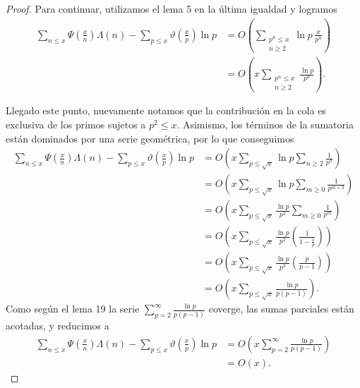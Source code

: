 \documentclass[10pt]{article}
\theoremstyle{definition}
\theoremstyle{remark}
\begin{document}
\begin{proof}
Para continuar, utilizamos el lema 5 en la \'ultima igualdad y logramos 
\begin{align*}
\sum_{n \leq x} \Psi\left(\frac{x}{n}\right)\Lambda(n) - \sum_{p \leq x} \vartheta\left(\frac{x}{p}\right)\ln p
&= O\left(\sum_{\substack{p^n \leq x \\ n \geq 2}} \ln p \, \frac{x}{p^n}\right) \\
&= O\left(x\sum_{\substack{p^n \leq x \\ n \geq 2}} \frac{\ln p}{p^n}\right).
\end{align*}

Llegado este punto, nuevamente notamos que la contribuci\'on en la cola es exclusiva de los primos sujetos a $p^2 \le x$. 
Asimismo, los t\'erminos de la sumatoria est\'an dominados por una serie geom\'etrica, 
por lo que conseguimos 
\begin{align*}
\sum_{n \leq x} \Psi\left(\frac{x}{n}\right)\Lambda(n) - \sum_{p \leq x} \vartheta\left(\frac{x}{p}\right)\ln p
&= O\left(x \sum_{p \leq \sqrt{x}} \ln p \sum_{n \geq 2} \frac{1}{p^n}\right) \\
%
&= O\left(x \sum_{p \leq \sqrt{x}} \ln p \sum_{m \geq 0} \frac{1}{p^{m + 2}}\right) \\
&= O\left(x \sum_{p \leq \sqrt{x}} \frac{\ln p}{p^2} \sum_{m \geq 0} \frac{1}{p^m}\right) \\
&= O\left(x \sum_{p \leq \sqrt{x}} \frac{\ln p}{p^2} \left(\frac{1}{1 - \frac{1}{p}}\right)\right) \\
&= O\left(x \sum_{p \leq \sqrt{x}} \frac{\ln p}{p^2} \left(\frac{p}{p - 1}\right)\right) \\
&= O\left(x \sum_{p \leq \sqrt{x}} \frac{\ln p}{p (p - 1)}\right).
\end{align*}
Como seg\'un el lema 19 la serie $\displaystyle{\sum_{p = 2}^{\infty} \frac{\ln p}{p (p - 1)}}$ coverge, 
las sumas parciales est\'an acotadas, y reducimos a 
\begin{align*}
\sum_{n \leq x} \Psi\left(\frac{x}{n}\right)\Lambda(n) - \sum_{p \leq x} \vartheta\left(\frac{x}{p}\right)\ln p
&= O\left(x \sum_{p = 2}^\infty \frac{\ln p}{p (p - 1)}\right) \\
&= O(x).
\end{align*}


\end{proof}
\end{document}

